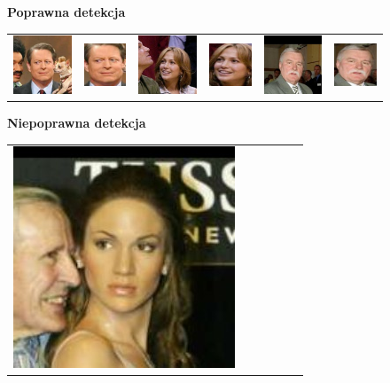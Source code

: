 \begin{figure}[H]
    \begin{center}
    \renewcommand\tabcolsep{1pt}
    {\bf Poprawna detekcja}
    \begin{tabular}{cc||cc||cc}
      \includegraphics[width=.15\linewidth]{img/crop_examples/before/good/Al_Gore_0007.jpg} &
      \includegraphics[width=.15\linewidth]{img/crop_examples/after/good/Al_Gore_0007.jpg} &
      \includegraphics[width=.15\linewidth]{img/crop_examples/before/good/Jennifer_Lopez_0021.jpg} &
      \includegraphics[width=.15\linewidth]{img/crop_examples/after/good/Jennifer_Lopez_0021.jpg} &
      \includegraphics[width=.15\linewidth]{img/crop_examples/before/good/Lech_Walesa_0002.jpg} &
      \includegraphics[width=.15\linewidth]{img/crop_examples/after/good/Lech_Walesa_0002.jpg} \\
    \end{tabular}
    {\bf Niepoprawna detekcja}
    \begin{tabular}{cc||cc||cc}
      \includegraphics[width=.15\linewidth]{img/crop_examples/before/bad/Jennifer_Lopez_0020.jpg} &

\end{tabular}
\end{center}
\end{figure}
